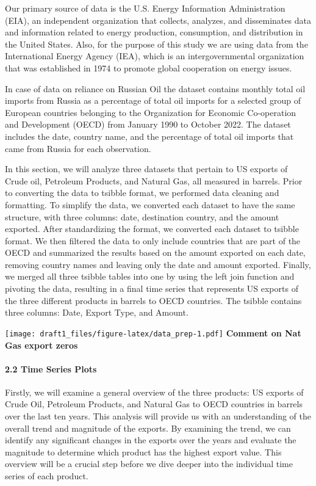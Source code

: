 \documentclass[
]{article}
\begin{document}
Our primary source of data is the U.S. Energy Information Administration
(EIA), an independent organization that collects, analyzes, and
disseminates data and information related to energy production,
consumption, and distribution in the United States. Also, for the
purpose of this study we are using data from the International Energy
Agency (IEA), which is an intergovernmental organization that was
established in 1974 to promote global cooperation on energy issues.

In case of data on reliance on Russian Oil the dataset contains monthly
total oil imports from Russia as a percentage of total oil imports for a
selected group of European countries belonging to the Organization for
Economic Co-operation and Development (OECD) from January 1990 to
October 2022. The dataset includes the date, country name, and the
percentage of total oil imports that came from Russia for each
observation.

In this section, we will analyze three datasets that pertain to US
exports of Crude oil, Petroleum Products, and Natural Gas, all measured
in barrels. Prior to converting the data to tsibble format, we performed
data cleaning and formatting. To simplify the data, we converted each
dataset to have the same structure, with three columns: date,
destination country, and the amount exported. After standardizing the
format, we converted each dataset to tsibble format. We then filtered
the data to only include countries that are part of the OECD and
summarized the results based on the amount exported on each date,
removing country names and leaving only the date and amount exported.
Finally, we merged all three tsibble tables into one by using the left
join function and pivoting the data, resulting in a final time series
that represents US exports of the three different products in barrels to
OECD countries. The tsibble contains three columns: Date, Export Type,
and Amount.

\texttt{[image: draft1\_files/figure-latex/data\_prep-1.pdf]}
\textbf{Comment on Nat Gas export zeros}

\hypertarget{time-series-plots}{%
\paragraph{2.2 Time Series Plots}\label{time-series-plots}}

Firstly, we will examine a general overview of the three products: US
exports of Crude Oil, Petroleum Products, and Natural Gas to OECD
countries in barrels over the last ten years. This analysis will provide
us with an understanding of the overall trend and magnitude of the
exports. By examining the trend, we can identify any significant changes
in the exports over the years and evaluate the magnitude to determine
which product has the highest export value. This overview will be a
crucial step before we dive deeper into the individual time series of
each product.
\end{document}
